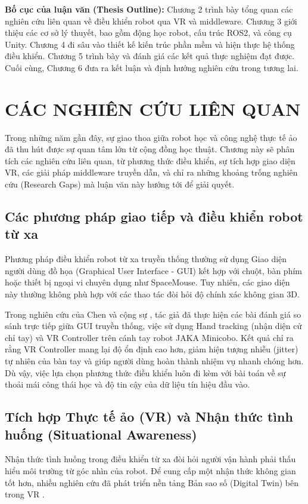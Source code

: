 \textbf{Bố cục của luận văn (Thesis Outline):} 
Chương 2 trình bày tổng quan các nghiên cứu liên quan về điều khiển robot qua VR và middleware. Chương 3 giới thiệu các cơ sở lý thuyết, bao gồm động học robot, cấu trúc ROS2, và công cụ Unity. Chương 4 đi sâu vào thiết kế kiến trúc phần mềm và hiện thực hệ thống điều khiển. Chương 5 trình bày và đánh giá các kết quả thực nghiệm đạt được. Cuối cùng, Chương 6 đưa ra kết luận và định hướng nghiên cứu trong tương lai.


\chapter{CÁC NGHIÊN CỨU LIÊN QUAN}
\label{chap:related_works}

Trong những năm gần đây, sự giao thoa giữa robot học và công nghệ thực tế ảo đã thu hút được sự quan tâm lớn từ cộng đồng học thuật. Chương này sẽ phân tích các nghiên cứu liên quan, từ phương thức điều khiển, sự tích hợp giao diện VR, các giải pháp middleware truyền dẫn, và chỉ ra những khoảng trống nghiên cứu (Research Gaps) mà luận văn này hướng tới để giải quyết.

\section{Các phương pháp giao tiếp và điều khiển robot từ xa}
Phương pháp điều khiển robot từ xa truyền thống thường sử dụng Giao diện người dùng đồ họa (Graphical User Interface - GUI) kết hợp với chuột, bàn phím hoặc thiết bị ngoại vi chuyên dụng như SpaceMouse. Tuy nhiên, các giao diện này thường không phù hợp với các thao tác đòi hỏi độ chính xác không gian 3D. 

Trong nghiên cứu của Chen và cộng sự \cite{chen2023comparing}, tác giả đã thực hiện các bài đánh giá so sánh trực tiếp giữa GUI truyền thống, việc sử dụng Hand tracking (nhận diện cử chỉ tay) và VR Controller trên cánh tay robot JAKA Minicobo. Kết quả chỉ ra rằng VR Controller mang lại độ ổn định cao hơn, giảm hiện tượng nhiễu (jitter) tự nhiên của bàn tay và giúp người dùng hoàn thành nhiệm vụ nhanh chóng hơn. Dù vậy, việc lựa chọn phương thức điều khiển luôn đi kèm với bài toán về sự thoải mái công thái học và độ tin cậy của dữ liệu tín hiệu đầu vào.

\section{Tích hợp Thực tế ảo (VR) và Nhận thức tình huống (Situational Awareness)}
Nhận thức tình huống trong điều khiển từ xa đòi hỏi người vận hành phải thấu hiểu môi trường từ góc nhìn của robot. Để cung cấp một nhận thức không gian tốt hơn, nhiều nghiên cứu đã phát triển nền tảng Bản sao số (Digital Twin) bên trong VR \cite{torrejón2026teleoperation}.

